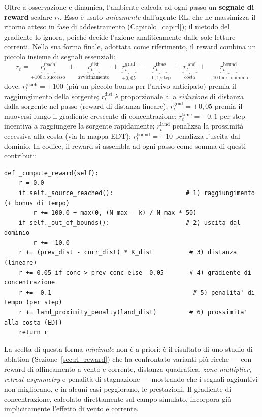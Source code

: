 Oltre a osservazione e dinamica, l'ambiente calcola ad ogni passo un \textbf{segnale di
reward} scalare $r_t$. Esso \`e usato \emph{unicamente} dall'agente RL, che ne massimizza
il ritorno atteso in fase di addestramento (Capitolo~\ref{cap:rl}); il metodo del gradiente
lo ignora, poich\'e decide l'azione analiticamente dalle sole letture correnti. Nella sua
forma finale, adottata come riferimento, il reward combina un piccolo insieme di segnali
essenziali:
\begin{equation}
    r_t = \underbrace{r^{\text{reach}}_t}_{+100\ \text{a successo}}
        \;+\; \underbrace{r^{\text{dist}}_t}_{\text{avvicinamento}}
        \;+\; \underbrace{r^{\text{grad}}_t}_{\pm 0{,}05}
        \;+\; \underbrace{r^{\text{time}}_t}_{-0{,}1/\text{step}}
        \;+\; \underbrace{r^{\text{land}}_t}_{\text{costa}}
        \;+\; \underbrace{r^{\text{bound}}_t}_{-10\ \text{fuori dominio}}
    \label{eq:reward}
\end{equation}
dove: $r^{\text{reach}}_t = +100$ (pi\`u un piccolo bonus per l'arrivo anticipato) premia il
raggiungimento della sorgente; $r^{\text{dist}}_t$
\`e proporzionale alla \emph{riduzione} di distanza dalla sorgente nel passo (reward di
distanza lineare); $r^{\text{grad}}_t = \pm 0{,}05$ premia il muoversi lungo il gradiente
crescente di concentrazione; $r^{\text{time}}_t = -0{,}1$ per step incentiva a raggiungere
la sorgente rapidamente; $r^{\text{land}}_t$ penalizza la prossimit\`a eccessiva alla costa
(via la mappa EDT); $r^{\text{bound}}_t = -10$ penalizza l'uscita dal dominio. In codice, il
reward si assembla ad ogni passo come somma di questi contributi:

\begin{lstlisting}
def _compute_reward(self):
    r = 0.0
    if self._source_reached():                    # 1) raggiungimento (+ bonus di tempo)
        r += 100.0 + max(0, (N_max - k) / N_max * 50)
    if self._out_of_bounds():                     # 2) uscita dal dominio
        r += -10.0
    r += (prev_dist - curr_dist) * K_dist          # 3) distanza (lineare)
    r += 0.05 if conc > prev_conc else -0.05       # 4) gradiente di concentrazione
    r += -0.1                                       # 5) penalita' di tempo (per step)
    r += land_proximity_penalty(land_dist)         # 6) prossimita' alla costa (EDT)
    return r
\end{lstlisting}

La scelta di questa forma \emph{minimale} non \`e a priori: \`e il risultato di uno studio
di ablation (Sezione~\ref{sec:rl_reward}) che ha confrontato varianti pi\`u ricche ---
con reward di allineamento a vento e corrente, distanza quadratica, \emph{zone multiplier},
\emph{retreat asymmetry} e penalit\`a di stagnazione --- mostrando che i segnali aggiuntivi
non migliorano, e in alcuni casi peggiorano, le prestazioni. Il gradiente di concentrazione,
calcolato direttamente sul campo simulato, incorpora gi\`a implicitamente l'effetto di vento
e corrente.

